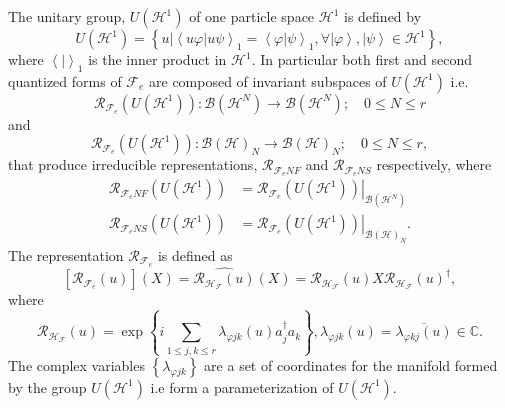 \documentclass[aps,preprint]{revtex4}%
\begin{document}
The unitary group, $U\left(  \mathcal{H}^{1}\right)  $ of one particle space
$\mathcal{H}^{1}$ is defined by
\begin{equation}
U\left(  \mathcal{H}^{1}\right)  =\left\{  \left.  u\right\vert \left\langle
\left.  u\varphi\right\vert u\psi\right\rangle _{1}=\left\langle \left.
\varphi\right\vert \psi\right\rangle _{1},\forall\left\vert \varphi
\right\rangle ,\left\vert \psi\right\rangle \in\mathcal{H}^{1}\right\}  ,
\end{equation}
where $\left\langle \left.  {}\right\vert \right\rangle _{1}$ is the inner
product in $\mathcal{H}^{1}.$ In particular both first and second quantized
forms of $\mathcal{F}_{e}$ are composed of invariant subspaces of $U\left(
\mathcal{H}^{1}\right)  $ i.e.
\begin{equation}
\mathcal{R}_{\mathcal{F}_{e}}\left(  U\left(  \mathcal{H}^{1}\right)  \right)
:\mathcal{B}\left(  \mathcal{H}^{N}\right)  \rightarrow\mathcal{B}\left(
\mathcal{H}^{N}\right)  ;\quad0\leq N\leq r
\end{equation}
and
\begin{equation}
\mathcal{R}_{\mathcal{F}_{e}}\left(  U\left(  \mathcal{H}^{1}\right)  \right)
:\mathcal{B}\left(  \mathcal{H}\right)  _{N}\rightarrow\mathcal{B}\left(
\mathcal{H}\right)  _{N};\quad0\leq N\leq r,
\end{equation}
that produce irreducible representations, $\mathcal{R}_{\mathcal{F}_{e}NF}$
and $\mathcal{R}_{\mathcal{F}_{e}NS}$ respectively, where
\begin{align}
\mathcal{R}_{\mathcal{F}_{e}NF}\left(  U\left(  \mathcal{H}^{1}\right)
\right)   &  =\left.  \mathcal{R}_{\mathcal{F}_{e}}\left(  U\left(
\mathcal{H}^{1}\right)  \right)  \right\vert _{\mathcal{B}\left(
\mathcal{H}^{N}\right)  }\\
\mathcal{R}_{\mathcal{F}_{e}NS}\left(  U\left(  \mathcal{H}^{1}\right)
\right)   &  =\left.  \mathcal{R}_{\mathcal{F}_{e}}\left(  U\left(
\mathcal{H}^{1}\right)  \right)  \right\vert _{\mathcal{B}\left(
\mathcal{H}\right)  _{N}}.
\end{align}
The representation $\mathcal{R}_{\mathcal{F}_{e}}$ is defined as
\begin{equation}
\left[  \mathcal{R}_{\mathcal{F}_{e}}\left(  u\right)  \right]  \left(
X\right)  =\widehat{\mathcal{R}_{\mathcal{H}_{\mathcal{F}}}\left(  u\right)
}\left(  X\right)  =\mathcal{R}_{\mathcal{H}_{\mathcal{F}}}\left(  u\right)
X\mathcal{R}_{\mathcal{H}_{\mathcal{F}}}\left(  u\right)  ^{\dagger},
\label{AdjointRep}%
\end{equation}
where
\begin{equation}
\mathcal{R}_{\mathcal{H}_{\mathcal{F}}}\left(  u\right)  =\exp\left\{
i\sum_{1\leq j,k\leq r}\lambda_{\varphi jk}\left(  u\right)  a_{j}^{\dagger
}a_{k}\right\}  ,\lambda_{\varphi jk}\left(  u\right)  =\overline
{\lambda_{\varphi kj}\left(  u\right)  }\in\mathbb{C}. \label{lamda}%
\end{equation}
The complex variables $\left\{  \lambda_{\varphi jk}\right\}  $ are a set of
coordinates for the manifold formed by the group $U\left(  \mathcal{H}%
^{1}\right)  $ i.e form a parameterization of $U\left(  \mathcal{H}%
^{1}\right)  .$
\end{document}
